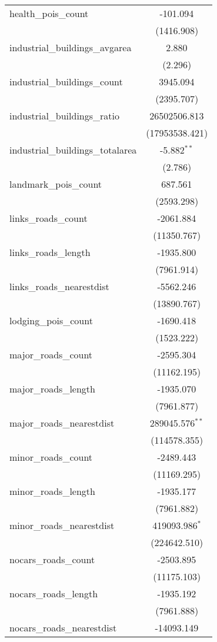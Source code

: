 \begin{table}[!htbp]
\begin{tabular}{@{\extracolsep{5pt}}lc}
 health_pois_count & -101.094$^{}$ \\
  & (1416.908) \\
 industrial_buildings_avgarea & 2.880$^{}$ \\
  & (2.296) \\
 industrial_buildings_count & 3945.094$^{}$ \\
  & (2395.707) \\
 industrial_buildings_ratio & 26502506.813$^{}$ \\
  & (17953538.421) \\
 industrial_buildings_totalarea & -5.882$^{**}$ \\
  & (2.786) \\
 landmark_pois_count & 687.561$^{}$ \\
  & (2593.298) \\
 links_roads_count & -2061.884$^{}$ \\
  & (11350.767) \\
 links_roads_length & -1935.800$^{}$ \\
  & (7961.914) \\
 links_roads_nearestdist & -5562.246$^{}$ \\
  & (13890.767) \\
 lodging_pois_count & -1690.418$^{}$ \\
  & (1523.222) \\
 major_roads_count & -2595.304$^{}$ \\
  & (11162.195) \\
 major_roads_length & -1935.070$^{}$ \\
  & (7961.877) \\
 major_roads_nearestdist & 289045.576$^{**}$ \\
  & (114578.355) \\
 minor_roads_count & -2489.443$^{}$ \\
  & (11169.295) \\
 minor_roads_length & -1935.177$^{}$ \\
  & (7961.882) \\
 minor_roads_nearestdist & 419093.986$^{*}$ \\
  & (224642.510) \\
 nocars_roads_count & -2503.895$^{}$ \\
  & (11175.103) \\
 nocars_roads_length & -1935.192$^{}$ \\
  & (7961.888) \\
 nocars_roads_nearestdist & -14093.149$^{}$ \\

\end{tabular}
\end{table}
